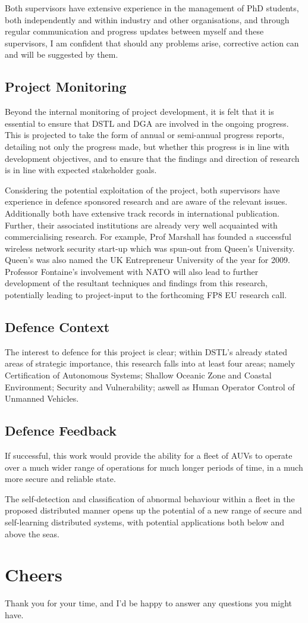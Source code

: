 \documentclass[oneside,9pt,a4paper]{Latex/Classes/PhDthesisPSnPDF}
\begin{document}
Both supervisors have extensive experience in the management of PhD students,
both independently and within industry and other organisations, and through
regular communication and progress updates between myself and these supervisors,
I am confident that should any problems arise, corrective action can and will be
suggested by them.

\subsection{Project Monitoring}  Beyond the internal monitoring of project development,
it is felt that it is essential to ensure that DSTL and DGA are involved in the
ongoing progress. This is projected to take the form of annual or semi-annual
progress reports, detailing not only the progress made, but whether this
progress is in line with development objectives, and to ensure that the findings
and direction of research is in line with expected stakeholder goals.

Considering the potential exploitation of the project, both supervisors have
experience in defence sponsored research and are aware of the relevant issues.
Additionally both have extensive track records in international publication.
Further, their associated institutions are already very well acquainted with
commercialising research. For example, Prof Marshall has founded a successful
wireless network security start-up which was spun-out from Queen's University.
Queen's was also named the UK Entrepreneur University of the year for 2009.
Professor Fontaine's involvement with NATO will also lead to further development
of the resultant techniques and findings from this research, potentially leading
to project-input to the forthcoming FP8 EU research call.

\subsection{Defence Context}  The interest to defence for this project is clear; within
DSTL's already stated  areas of strategic importance, this research falls into
at least four areas; namely Certification of Autonomous Systems; Shallow Oceanic
Zone and Coastal Environment; Security and Vulnerability; aswell as Human
Operator Control of Unmanned Vehicles.

\subsection{Defence Feedback}  If successful, this work would provide the ability for a
fleet of AUVs to operate over a much wider range of operations for much longer
periods of time, in a much more secure and reliable state.

The self-detection and classification of abnormal behaviour within a fleet in
the proposed distributed manner opens up the potential of a new range of secure
and self-learning distributed systems, with potential applications both below
and above the seas.

\section{Cheers}  Thank you for your time, and I'd be happy to answer any questions
you might have.
\end{document}
